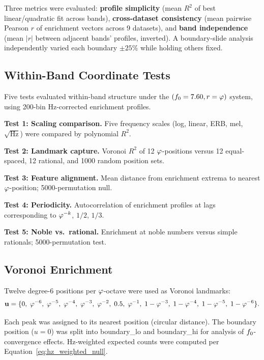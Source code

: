 Three metrics were evaluated: \textbf{profile simplicity} (mean $R^2$ of best linear/quadratic fit across bands), \textbf{cross-dataset consistency} (mean pairwise Pearson $r$ of enrichment vectors across 9 datasets), and \textbf{band independence} (mean $|r|$ between adjacent bands' profiles, inverted). A boundary-slide analysis independently varied each boundary $\pm 25\%$ while holding others fixed.

\subsection{Within-Band Coordinate Tests}
\label{sec:within_methods}

Five tests evaluated within-band structure under the $(f_0 = 7.60, r = \varphi)$ system, using 200-bin Hz-corrected enrichment profiles.

\textbf{Test 1: Scaling comparison.} Five frequency scales (log, linear, ERB, mel, $\sqrt{\text{Hz}}$) were compared by polynomial $R^2$.

\textbf{Test 2: Landmark capture.} Voronoi $R^2$ of 12 $\varphi$-positions versus 12 equal-spaced, 12 rational, and 1000 random position sets.

\textbf{Test 3: Feature alignment.} Mean distance from enrichment extrema to nearest $\varphi$-position; 5000-permutation null.

\textbf{Test 4: Periodicity.} Autocorrelation of enrichment profiles at lags corresponding to $\varphi^{-k}$, $1/2$, $1/3$.

\textbf{Test 5: Noble vs.\ rational.} Enrichment at noble numbers versus simple rationals; 5000-permutation test.

\subsection{Voronoi Enrichment}
\label{sec:voronoi}

Twelve degree-6 positions per $\varphi$-octave were used as Voronoi landmarks:
\begin{equation}
\mathbf{u} = \{0,\; \varphi^{-6},\; \varphi^{-5},\; \varphi^{-4},\; \varphi^{-3},\; \varphi^{-2},\; 0.5,\; \varphi^{-1},\; 1-\varphi^{-3},\; 1-\varphi^{-4},\; 1-\varphi^{-5},\; 1-\varphi^{-6}\}.
\end{equation}

Each peak was assigned to its nearest position (circular distance). The boundary position ($u = 0$) was split into boundary\_lo and boundary\_hi for analysis of $f_0$-convergence effects. Hz-weighted expected counts were computed per Equation~\ref{eq:hz_weighted_null}.

